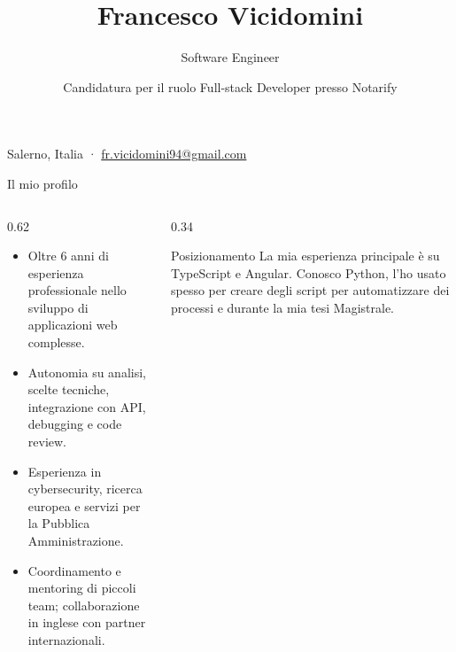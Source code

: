 \documentclass[aspectratio=169,11pt]{beamer}
\title{Francesco Vicidomini}
\subtitle{Software Engineer}
\author{Candidatura per il ruolo Full-stack Developer presso Notarify}
\date{}
\begin{document}
{
  \begin{frame}[plain]
    \vfill
    {\color{white}\LARGE\bfseries\inserttitle\par}
    \vspace{0.35cm}
    {\color{AccentSoft}\Large\insertsubtitle\par}
    \vspace{0.75cm}
    {\color{white}\normalsize\insertauthor\par}
    \vfill
    {\color{AccentSoft}\small
      Salerno, Italia \quad·\quad
      \href{mailto:fr.vicidomini94@gmail.com}{fr.vicidomini94@gmail.com}
    }
  \end{frame}
}

\begin{frame}{Il mio profilo}
  \begin{columns}[T,onlytextwidth]
    \begin{column}{0.62\textwidth}
      \begin{itemize}
        \item Oltre \alert{6 anni di esperienza professionale} nello sviluppo di applicazioni web complesse.
        \item Autonomia su analisi, scelte tecniche, integrazione con API, debugging e code review.
        \item Esperienza in cybersecurity, ricerca europea e servizi per la Pubblica Amministrazione.
        \item Coordinamento e mentoring di piccoli team; collaborazione in inglese con partner internazionali.
      \end{itemize}
    \end{column}
    \begin{column}{0.34\textwidth}
      \begin{block}{Posizionamento}
        La mia esperienza principale è su TypeScript e Angular. Conosco Python, l'ho usato spesso per creare degli script per automatizzare dei processi e durante la mia tesi Magistrale.
      \end{block}
    \end{column}
  \end{columns}
\end{frame}
\end{document}
